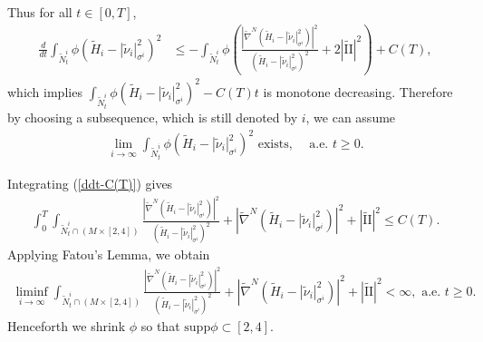 \documentclass[11pt, letterpaper]{amsart}
\theoremstyle{definition}
\theoremstyle{remark}
\begin{document}
Thus for all $t \in [0,T]$,
\begin{align}\label{ddt-C(T)}
	\frac{d}{d t} \int_{\tilde{N}^{i}_t} \phi (\tilde{H}_{i}- |\tilde{\nu}_{i} |^2_{\sigma ^{i} })^2 &\leq -\int_{\tilde{N}^{i}_t}\phi \left( \frac{|\tilde{\nabla} ^{N} (\tilde{H}_i-|\tilde{\nu}_i |^2_{\sigma^{i} })|^2}{(\tilde{H}_i-|\tilde{\nu}_i |^2_{\sigma^{i} })^2} + 2|\tilde{\mathrm{II}}|^2 \right)  + C(T),
\end{align} 
which implies $\int_{\tilde{N}^{i}_{t}} \phi (\tilde{H}_{i}- |\tilde{\nu}_{i} |^2_{\sigma ^{i} })^2 - C(T) t $ is monotone decreasing. Therefore by choosing a subsequence, which is still denoted by $i$, we can assume
\begin{align}\label{N_t-limit-exists}
	\lim_{i\to \infty} \int_{\tilde{N}^{i}_{t}} \phi (\tilde{H}_{i}- |\tilde{\nu}_{i} |^2_{\sigma ^{i} })^2 \text{ exists, } \quad \text{a.e. } t \geq 0.
\end{align}


Integrating (\ref{ddt-C(T)}) gives
\begin{align}\label{integral-C(T)}
	\int_{0}^{T} \int_{\tilde{N}^{i}_t \cap (M \times [2,4])} \frac{|\tilde{\nabla} ^{N} (\tilde{H}_i-|\tilde{\nu}_i |^2_{\sigma^{i} })|^2}{(\tilde{H}_i-|\tilde{\nu}_i |^2_{\sigma^{i} })^2} + |\tilde{\nabla} ^{N} (\tilde{H}_i-|\tilde{\nu}_i |^2_{\sigma^{i} })|^2 + |\tilde{\mathrm{II}}|^2 \leq C(T).
\end{align}  
Applying Fatou's Lemma, we obtain
\begin{align}\label{liminf-estimates}
	\liminf_{i\to \infty} \int_{\tilde{N}^{i}_t \cap (M \times [2,4])} \frac{|\tilde{\nabla} ^{N} (\tilde{H}_i-|\tilde{\nu}_i |^2_{\sigma^{i} })|^2}{(\tilde{H}_i-|\tilde{\nu}_i |^2_{\sigma^{i} })^2} + |\tilde{\nabla} ^{N} (\tilde{H}_i-|\tilde{\nu}_i |^2_{\sigma^{i} })|^2 + |\tilde{\mathrm{II}}|^2 < \infty, \text{ a.e. } t \geq 0.
\end{align} 
Henceforth we shrink $\phi $ so that $\mathrm{supp} \phi \subset [2, 4]$. 
\end{document}
